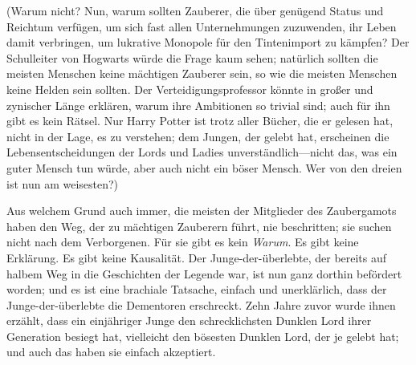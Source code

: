 (Warum nicht? Nun, warum sollten Zauberer, die über genügend Status und Reichtum verfügen, um sich fast allen Unternehmungen zuzuwenden, ihr Leben damit verbringen, um lukrative Monopole für den Tintenimport zu kämpfen? Der Schulleiter von Hogwarts würde die Frage kaum sehen; natürlich sollten die meisten Menschen keine mächtigen Zauberer sein, so wie die meisten Menschen keine Helden sein sollten. Der Verteidigungsprofessor könnte in großer und zynischer Länge erklären, warum ihre Ambitionen so trivial sind; auch für ihn gibt es kein Rätsel. Nur Harry Potter ist trotz aller Bücher, die er gelesen hat, nicht in der Lage, es zu verstehen; dem Jungen, der gelebt hat, erscheinen die Lebensentscheidungen der Lords und Ladies unverständlich—nicht das, was ein guter Mensch tun würde, aber auch nicht ein böser Mensch. Wer von den dreien ist nun am weisesten?)

Aus welchem Grund auch immer, die meisten der Mitglieder des Zaubergamots haben den Weg, der zu mächtigen Zauberern führt, nie beschritten; sie suchen nicht nach dem Verborgenen. Für sie gibt es kein \emph{Warum}. Es gibt keine Erklärung. Es gibt keine Kausalität. Der Junge-der-überlebte, der bereits auf halbem Weg in die Geschichten der Legende war, ist nun ganz dorthin befördert worden; und es ist eine brachiale Tatsache, einfach und unerklärlich, dass der Junge-der-überlebte die Dementoren erschreckt. Zehn Jahre zuvor wurde ihnen erzählt, dass ein einjähriger Junge den schrecklichsten Dunklen Lord ihrer Generation besiegt hat, vielleicht den bösesten Dunklen Lord, der je gelebt hat; und auch das haben sie einfach akzeptiert.

